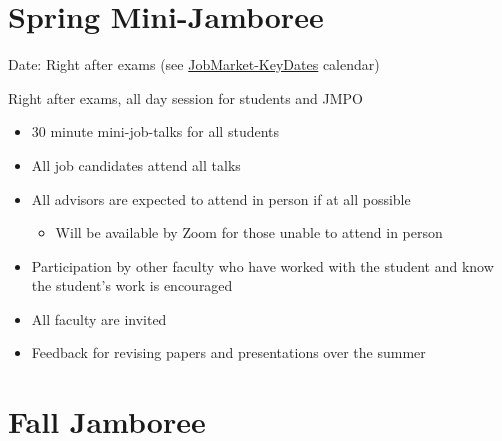 \documentclass{scrartcl}
\begin{document}
\medskip


\hypertarget{jamboree-mini-spring}{}
\section*{Spring Mini-Jamboree}

Date: Right after exams (see \href{https://calendar.google.com/calendar/u/0?cid=amh1ZWNvbi5vcmdfYnUyM2xoNXA2a2IwbjMzYmprdWI0am5pa3NAZ3JvdXAuY2FsZW5kYXIuZ29vZ2xlLmNvbQ}{JobMarket-KeyDates} calendar)

Right after exams, all day session for students and JMPO
\begin{itemize}
  
\item 30 minute mini-job-talks for all students
\item All job candidates attend all talks
\item All advisors are expected to attend in person if at all possible
  \begin{itemize}
  \item Will be available by Zoom for those unable to attend in person
  \end{itemize}
\item Participation by other faculty who have worked with the student and know the student's work is encouraged
\item All faculty are invited
\item Feedback for revising papers and presentations over the summer
\end{itemize}

\hypertarget{jamboree-maxi-fall}{}
\section*{Fall Jamboree}
\end{document}
